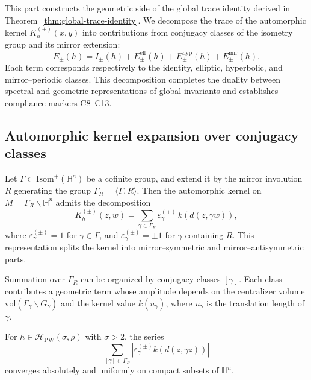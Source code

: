 This part constructs the geometric side of the global trace identity derived in Theorem~\ref{thm:global-trace-identity}.  
We decompose the trace of the automorphic kernel $K_h^{(\pm)}(x,y)$ into contributions from conjugacy classes of the isometry group and its mirror extension:
\[
E_\pm(h) = I_\pm(h) + E_\pm^{\mathrm{ell}}(h) + E_\pm^{\mathrm{hyp}}(h) + E_\pm^{\mathrm{mir}}(h).
\]
Each term corresponds respectively to the identity, elliptic, hyperbolic, and mirror–periodic classes.  
This decomposition completes the duality between spectral and geometric representations of global invariants and establishes compliance markers C8–C13. %
\FlowBreaker

\subsection{Automorphic kernel expansion over conjugacy classes}
\label{subsec:ch6-part5-kernel-expansion} \relax

\begin{definition}
\label{def:kernel-decomposition}
Let $\Gamma\subset\mathrm{Isom}^+(\mathbb{H}^n)$ be a cofinite group, and extend it by the mirror involution $R$ generating the group $\Gamma_R=\langle \Gamma,R\rangle$.  
Then the automorphic kernel on $M=\Gamma_R\backslash\mathbb{H}^n$ admits the decomposition
\[
K_h^{(\pm)}(z,w)
=\sum_{\gamma\in\Gamma_R} \varepsilon_\gamma^{(\pm)}\,k(d(z,\gamma w)),
\]
where $\varepsilon_\gamma^{(\pm)}=1$ for $\gamma\in\Gamma$, and $\varepsilon_\gamma^{(\pm)}=\pm1$ for $\gamma$ containing $R$.  
This representation splits the kernel into mirror–symmetric and mirror–antisymmetric parts. %
\end{definition}

\begin{remark}
\label{rem:class-sum}
Summation over $\Gamma_R$ can be organized by conjugacy classes $[\gamma]$.  
Each class contributes a geometric term whose amplitude depends on the centralizer volume $\mathrm{vol}(\Gamma_\gamma\backslash G_\gamma)$ and the kernel value $k(u_\gamma)$, where $u_\gamma$ is the translation length of $\gamma$. %
\end{remark}

\begin{lemma}
\label{lem:geom-convergence}
For $h\in\mathcal{H}_{\mathrm{PW}}(\sigma,\rho)$ with $\sigma>2$, the series
\[
\sum_{[\gamma]\in\Gamma_R}|\varepsilon_\gamma^{(\pm)}k(d(z,\gamma z))|
\]
converges absolutely and uniformly on compact subsets of $\mathbb{H}^n$. %
\end{lemma}

